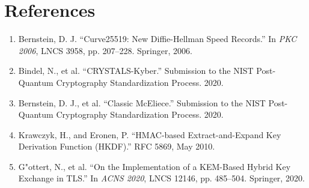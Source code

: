 \documentclass[11pt]{article}
\begin{document}
\section*{References}
\begin{enumerate}
    \item Bernstein, D. J. ``Curve25519: New Diffie-Hellman Speed Records.'' In \textit{PKC 2006}, LNCS 3958, pp. 207--228. Springer, 2006.
    \item Bindel, N., et al. ``CRYSTALS-Kyber.'' Submission to the NIST Post-Quantum Cryptography Standardization Process. 2020.
    \item Bernstein, D. J., et al. ``Classic McEliece.'' Submission to the NIST Post-Quantum Cryptography Standardization Process. 2020.
    \item Krawczyk, H., and Eronen, P. ``HMAC-based Extract-and-Expand Key Derivation Function (HKDF).'' RFC 5869, May 2010.
    \item G"ottert, N., et al. ``On the Implementation of a KEM-Based Hybrid Key Exchange in TLS.'' In \textit{ACNS 2020}, LNCS 12146, pp. 485--504. Springer, 2020.
\end{enumerate}
\end{document}

